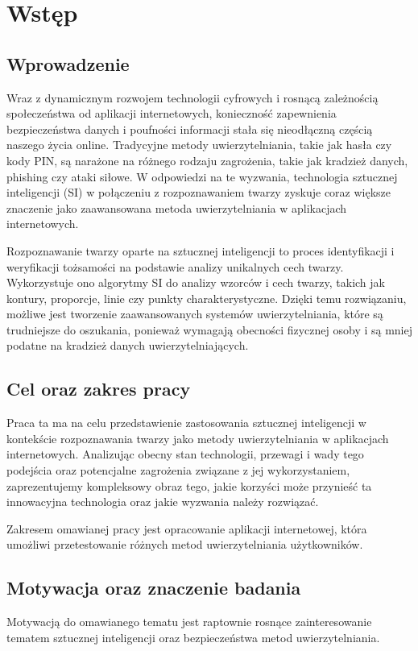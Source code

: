 \chapter{Wstęp}
\section{Wprowadzenie}
Wraz z dynamicznym rozwojem technologii cyfrowych i rosnącą zależnością społeczeństwa od aplikacji internetowych, konieczność zapewnienia bezpieczeństwa danych i poufności informacji stała się nieodłączną częścią naszego życia online. Tradycyjne metody uwierzytelniania, takie jak hasła czy kody PIN, są narażone na różnego rodzaju zagrożenia, takie jak kradzież danych, phishing czy ataki siłowe. W odpowiedzi na te wyzwania, technologia sztucznej inteligencji (SI) w połączeniu z rozpoznawaniem twarzy zyskuje coraz większe znaczenie jako zaawansowana metoda uwierzytelniania w aplikacjach internetowych.

Rozpoznawanie twarzy oparte na sztucznej inteligencji to proces identyfikacji i weryfikacji tożsamości na podstawie analizy unikalnych cech twarzy. Wykorzystuje ono algorytmy SI do analizy wzorców i cech twarzy, takich jak kontury, proporcje, linie czy punkty charakterystyczne. Dzięki temu rozwiązaniu, możliwe jest tworzenie zaawansowanych systemów uwierzytelniania, które są trudniejsze do oszukania, ponieważ wymagają obecności fizycznej osoby i są mniej podatne na kradzież danych uwierzytelniających.
\section{Cel oraz zakres pracy}
Praca ta ma na celu przedstawienie zastosowania sztucznej inteligencji w kontekście rozpoznawania twarzy jako metody uwierzytelniania w aplikacjach internetowych. Analizując obecny stan technologii, przewagi i wady tego podejścia oraz potencjalne zagrożenia związane z jej wykorzystaniem, zaprezentujemy kompleksowy obraz tego, jakie korzyści może przynieść ta innowacyjna technologia oraz jakie wyzwania należy rozwiązać.
   
Zakresem omawianej pracy jest opracowanie aplikacji internetowej, która umożliwi przetestowanie różnych metod uwierzytelniania użytkowników.
\section{Motywacja oraz znaczenie badania}
Motywacją do omawianego tematu jest raptownie rosnące zainteresowanie tematem sztucznej inteligencji oraz bezpieczeństwa metod uwierzytelniania.

